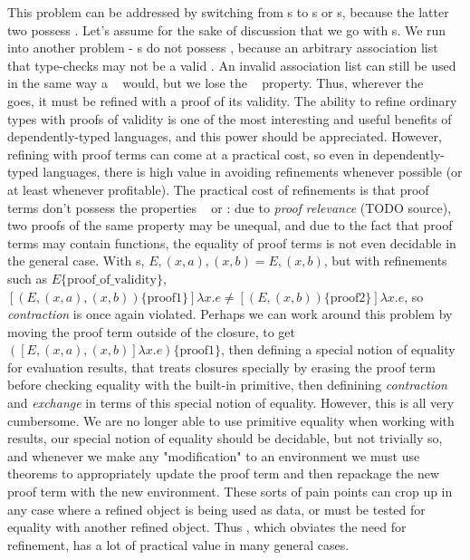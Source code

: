 \newcommand{\refine}[2]{\ensuremath{{#1}\{\text{#2}\}}}

This problem can be addressed by switching from {\SAL}s to {\cal}s or {\fpf}s, because the latter two possess
\SemInj. Let's assume for the sake of discussion that we go with {\CAL}s. We run into another problem - {\CAL}s
do not possess \SemTot, because an arbitrary association list that type-checks may not be a valid \CAL.
An invalid association list can still be used in the same way a \SAL~ would, but we lose the
\SemInj~ property. Thus, wherever the \CAL~ goes, it must be refined with a proof of its validity. The ability
to refine ordinary types with proofs of validity is one of the most interesting and useful benefits of
dependently-typed languages, and this power should be appreciated. However, refining with proof terms can
come at a practical cost, so even in dependently-typed languages, there is high value in avoiding refinements
whenever possible (or at least whenever profitable). The practical cost of refinements is that proof terms
don't possess the properties \SemInj~ or \EqDec: due to \emph{proof relevance} (TODO source), two proofs of
the same property may be unequal, and due to the fact that proof terms may contain functions, the equality of
proof terms is not even decidable in the general case. With {\CAL}s, \mbox{$E, (x, a), (x, b) = E, (x, b)$},
but with refinements such as \refine{E}{proof\_of\_validity},
\mbox{$[\refine{(E, (x, a), (x, b))}{proof1}]\lambda x . e \ne [\refine{(E, (x, b))}{proof2}]\lambda x . e$},
so \emph{contraction} is once again violated. Perhaps we can work around this problem by moving the proof term
outside of the closure, to get \mbox{\refine{([E, (x, a), (x, b)]\lambda x . e)}{proof1}}, then defining a
special notion of equality for evaluation results, that treats closures specially by erasing the proof term
before checking equality with the built-in primitive, then definining \emph{contraction} and \emph{exchange}
in terms of this special notion of equality. However, this is all very cumbersome. We are no longer able to
use primitive equality when working with results, our special notion of equality should be decidable, but
not trivially so, and whenever we make any "modification" to an environment we must use theorems
to appropriately update the proof term and then repackage the new proof term with the new environment.
These sorts of pain points can crop up in any case where a refined object is being used as data, or must be
tested for equality with another refined object. Thus \SemTot, which obviates the need for refinement, has
a lot of practical value in many general cases.

